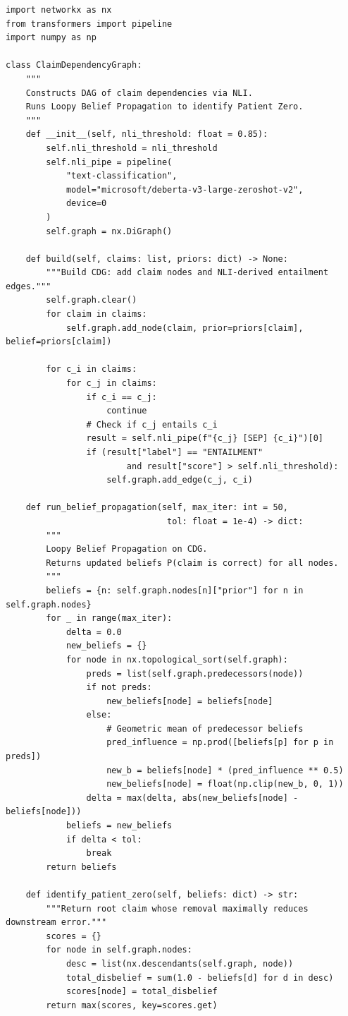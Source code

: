 \documentclass[12pt,a4paper]{report}
\begin{document}
\begin{lstlisting}[caption={CDG Construction and Belief Propagation for Patient Zero Identification},
                   label={lst:cdg}]
import networkx as nx
from transformers import pipeline
import numpy as np

class ClaimDependencyGraph:
    """
    Constructs DAG of claim dependencies via NLI.
    Runs Loopy Belief Propagation to identify Patient Zero.
    """
    def __init__(self, nli_threshold: float = 0.85):
        self.nli_threshold = nli_threshold
        self.nli_pipe = pipeline(
            "text-classification",
            model="microsoft/deberta-v3-large-zeroshot-v2",
            device=0
        )
        self.graph = nx.DiGraph()

    def build(self, claims: list, priors: dict) -> None:
        """Build CDG: add claim nodes and NLI-derived entailment edges."""
        self.graph.clear()
        for claim in claims:
            self.graph.add_node(claim, prior=priors[claim], belief=priors[claim])

        for c_i in claims:
            for c_j in claims:
                if c_i == c_j:
                    continue
                # Check if c_j entails c_i
                result = self.nli_pipe(f"{c_j} [SEP] {c_i}")[0]
                if (result["label"] == "ENTAILMENT"
                        and result["score"] > self.nli_threshold):
                    self.graph.add_edge(c_j, c_i)

    def run_belief_propagation(self, max_iter: int = 50,
                                tol: float = 1e-4) -> dict:
        """
        Loopy Belief Propagation on CDG.
        Returns updated beliefs P(claim is correct) for all nodes.
        """
        beliefs = {n: self.graph.nodes[n]["prior"] for n in self.graph.nodes}
        for _ in range(max_iter):
            delta = 0.0
            new_beliefs = {}
            for node in nx.topological_sort(self.graph):
                preds = list(self.graph.predecessors(node))
                if not preds:
                    new_beliefs[node] = beliefs[node]
                else:
                    # Geometric mean of predecessor beliefs
                    pred_influence = np.prod([beliefs[p] for p in preds])
                    new_b = beliefs[node] * (pred_influence ** 0.5)
                    new_beliefs[node] = float(np.clip(new_b, 0, 1))
                delta = max(delta, abs(new_beliefs[node] - beliefs[node]))
            beliefs = new_beliefs
            if delta < tol:
                break
        return beliefs

    def identify_patient_zero(self, beliefs: dict) -> str:
        """Return root claim whose removal maximally reduces downstream error."""
        scores = {}
        for node in self.graph.nodes:
            desc = list(nx.descendants(self.graph, node))
            total_disbelief = sum(1.0 - beliefs[d] for d in desc)
            scores[node] = total_disbelief
        return max(scores, key=scores.get)
\end{lstlisting}
\end{document}
